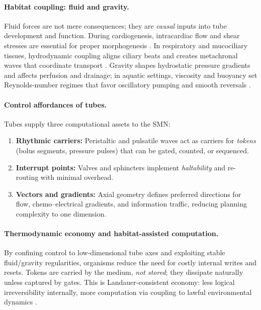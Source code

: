\paragraph{Habitat coupling: fluid and gravity.}
Fluid forces are not mere consequences; they are \emph{causal} inputs into tube development and function.
During cardiogenesis, intracardiac flow and shear stresses are essential for proper morphogenesis \cite{HoveKoster2003CardioFlow}.
In respiratory and mucociliary tissues, hydrodynamic coupling aligns ciliary beats and creates metachronal waves that coordinate transport \cite{GuiraoJoanny2007CiliaFlow}.
Gravity shapes hydrostatic pressure gradients and affects perfusion and drainage; in aquatic settings, viscosity and buoyancy set Reynolds-number regimes that favor oscillatory pumping and smooth reversals \cite{Vogel1994LifeInMovingFluids}.

\paragraph{Control affordances of tubes.}
Tubes supply three computational assets to the SMN:
\begin{enumerate}
  \item \textbf{Rhythmic carriers:} Peristaltic and pulsatile waves act as carriers for \emph{tokens} (bolus segments, pressure pulses) that can be gated, counted, or sequenced.
  \item \textbf{Interrupt points:} Valves and sphincters implement \emph{haltability} and re-routing with minimal overhead.
  \item \textbf{Vectors and gradients:} Axial geometry defines preferred directions for flow, chemo--electrical gradients, and information traffic, reducing planning complexity to one dimension.
\end{enumerate}

\paragraph{Thermodynamic economy and habitat-assisted computation.}
By confining control to low-dimensional tube axes and exploiting stable fluid/gravity regularities, organisms reduce the need for costly internal writes and resets.
Tokens are carried by the medium, \emph{not stored}; they dissipate naturally unless captured by gates.
This is Landauer-consistent economy: less logical irreversibility internally, more computation via coupling to lawful environmental dynamics \cite{Landauer1961Irreversibility,Bennett2003LandauerNotes,StillEtAl2012ThermoPrediction}.

